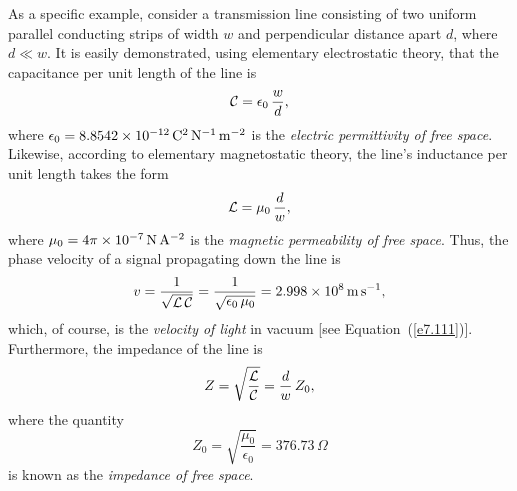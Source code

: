 As a specific example, consider a transmission line consisting of two uniform parallel conducting
strips of width $w$ and perpendicular distance apart $d$, where $d\ll w$. It is
easily demonstrated, using elementary electrostatic theory, that the capacitance
per unit length of the line is
\begin{equation}
{\cal C} = \epsilon_0\,\frac{w}{d},
\end{equation}
where $\epsilon_0= 8.8542\times 10^{-12}\,{\rm C}^2\,{\rm N}^{-1}\,{\rm m}^{-2}$
is the {\em electric permittivity of free space}. 
Likewise, according to elementary magnetostatic theory, the line's inductance per
unit length takes the form
\begin{equation}
{\cal L} = \mu_0\,\frac{d}{w},
\end{equation}
where $\mu_0 = 4\pi\times 10^{-7}\,{\rm N}\,{\rm A}^{-2}$ is the {\em magnetic
permeability of free space}. 
Thus, the phase velocity of a signal propagating down the line is
\begin{equation}
v = \frac{1}{\sqrt{{\cal L}\,{\cal C}}} = \frac{1}{\sqrt{\epsilon_0\,\mu_0}} = 2.998\times 10^8\,{\rm m}\,{\rm s}^{-1},
\end{equation}
which, of course, is the {\em velocity of light}\/ in vacuum [see Equation~(\ref{e7.111})]. Furthermore, the impedance of the line
is
\begin{equation}
Z = \sqrt{\frac{{\cal L}}{{\cal C}}} =\frac{d}{w}\,Z_0,
\end{equation}
where the quantity
\begin{equation}\label{e7.69x}
Z_0 = \sqrt{\frac{\mu_0}{\epsilon_0}} =  376.73\,\Omega
\end{equation}
is known as the {\em impedance of free space}. 

